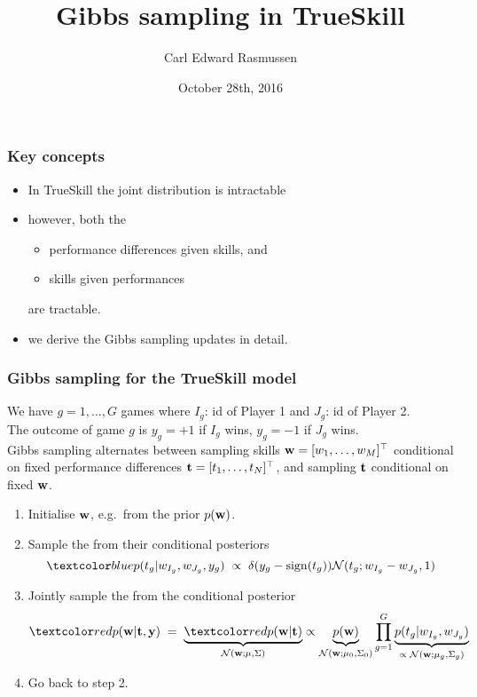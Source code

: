 

\title{Gibbs sampling in TrueSkill}
\author{Carl Edward Rasmussen}
\date{October 28th, 2016}




\begin{frame}
\titlepage
\end{frame}


\begin{frame}
\frametitle{Key concepts}

\begin{itemize}
\item In TrueSkill the joint distribution is intractable
\item however, both the 
\begin{itemize}
\item performance differences given skills, and
\item skills given performances
\end{itemize}
are tractable.
\item we derive the Gibbs sampling updates in detail.
\end{itemize}
\end{frame}


\begin{frame}
\frametitle{Gibbs sampling for the TrueSkill model}

We have $g=1,\ldots,G$ games where $I_g$: id of Player 1 and $J_g$:
id of Player 2.\\ The outcome of game $g$ is $y_g=+1$ if $I_g$ wins, $y_g=-1$ if $J_g$ wins.\\[1ex]

Gibbs sampling alternates between sampling skills
$\mathbf w=[w_1,\ldots,w_M]^\top$ conditional on fixed performance
differences $\mathbf t=[t_1,\ldots,t_N]^\top$, and sampling $\mathbf t$
conditional on fixed $\mathbf w$.
\begin{enumerate}
\item Initialise $\mathbf w$, e.g.\ from the prior $p(\mathbf w)$.
\item Sample the  from their
  conditional posteriors
\[
\Blue{p(t_g|w_{I_g}, w_{J_g},y_g)}\;\propto\;
\delta(y_g-\operatorname{sign}(t_g))\N(t_g; w_{I_g}-w_{J_g}, 1)
\]
\item Jointly sample the  from the conditional posterior 
\[
\Red{p(\bfw|\bft,\bfy)}\;=\;\underbrace{\Red{p(\bfw|\bft)}}_{\N(\bfw; \mu, \Sigma)}
\propto 
\underbrace{p(\bfw)}_{\N(\bfw; \mu_0, \Sigma_0)}
\prod_{g=1}^G 
\underbrace{p(t_g|w_{I_g}, w_{J_g})}_{\propto\;\N(\bfw; \mu_g, \Sigma_g)}
\]
\item Go back to step 2.
\end{enumerate}

\end{frame}


